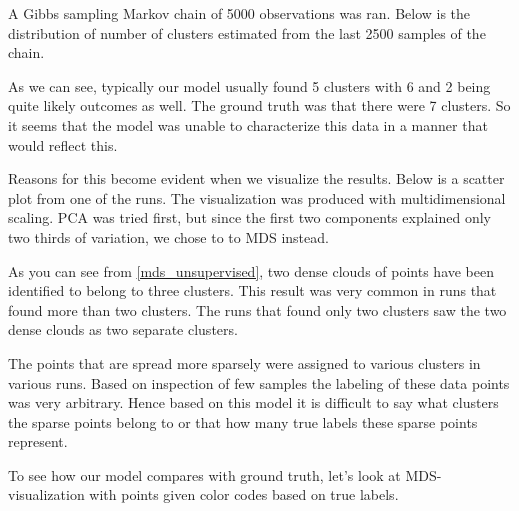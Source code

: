 \documentclass[a4paper]{article}
\begin{document}
\par
A Gibbs sampling Markov chain of 5000 observations was ran. Below is the distribution of number of clusters estimated from the last 2500 samples of the chain.


As we can see, typically our model usually found 5 clusters with 6 and 2 being quite likely outcomes as well. The ground truth was that there were 7 clusters. So it seems that the model was unable to characterize this data in a manner that would reflect this.

Reasons for this become evident when we visualize the results. Below is a scatter plot from one of the runs. The visualization was produced with multidimensional scaling. PCA was tried first, but since the first two components explained only two thirds of variation, we chose to to MDS instead. 


As you can see from \ref{mds_unsupervised}, two dense clouds of points have been identified to belong to three clusters. This result was very common in runs that found more than two clusters. The runs that found only two clusters saw the two dense clouds as two separate clusters.

 The points that are spread more sparsely were assigned to various clusters in various runs. Based on inspection of few samples the labeling of these data points was very arbitrary. Hence based on this model it is difficult to say what clusters the sparse points belong to or that how many true labels these sparse points represent.

To see how our model compares with ground truth, let's look at MDS-visualization with points given color codes based on true labels.

\end{document}

